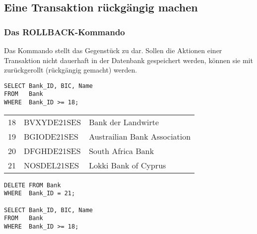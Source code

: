 \subsection{Eine Transaktion rückgängig machen}
\subsubsection{Das ROLLBACK-Kommando}
Das Kommando \ROLLBACK{} stellt das Gegenstück zu \COMMIT{} dar.
Sollen die Aktionen einer Transaktion nicht dauerhaft in der Datenbank
gespeichert werden, können sie mit \ROLLBACK{} zurückgerollt
(rückgängig gemacht) werden.
\begin{lstlisting}[language=oracle_sql,caption={Eine Transaktion wird abgebrochen},label=sql07_28]
SELECT Bank_ID, BIC, Name
FROM   Bank
WHERE  Bank_ID >= 18;
          \end{lstlisting}
\begin{center}
    \begin{small}
        \tablehead{}
        \begin{msoraclesql}
            \begin{supertabular}{rll}
                18 & BVXYDE21SES & Bank der Landwirte \\
                19 & BGIODE21SES & Austrailian Bank Association \\
                20 & DFGHDE21SES & South Africa Bank \\
                21 & NOSDEL21SES & Lokki Bank of Cyprus \\
            \end{supertabular}
        \end{msoraclesql}
    \end{small}
\end{center}
\begin{lstlisting}[language=oracle_sql,label=sql07_29]
DELETE FROM Bank
WHERE  Bank_ID = 21;

SELECT Bank_ID, BIC, Name
FROM   Bank
WHERE  Bank_ID >= 18;
          \end{lstlisting}
